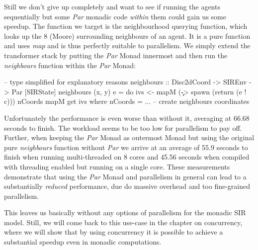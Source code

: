 Still we don't give up completely and want to see if running the agents sequentially but some \textit{Par} monadic code \textit{within} them could gain us some speedup. The function we target is the neighbourhood querying function, which looks up the 8 (Moore) surrounding neighbours of an agent. It is a pure function and uses \textit{map} and is thus perfectly suitable to parallelism. We simply extend the transformer stack by putting the \textit{Par} Monad innermost and then run the \textit{neighbours} function within the \textit{Par} Monad:

\begin{HaskellCode}
-- type simplified for explanatory reasons
neighbours :: Disc2dCoord -> SIREnv -> Par [SIRState]
neighbours (x, y) e = do
    ivs <- mapM (\c -> spawn (return (e ! c))) nCoords
    mapM get ivs
  where
    nCoords = ... -- create neighbours coordinates
\end{HaskellCode}

Unfortunately the performance is even worse than without it, averaging at 66.68 seconds to finish. The workload seems to be too low for parallelism to pay off. Further, when keeping the \textit{Par} Monad as outermost Monad but using the original pure \textit{neighbours} function without \textit{Par} we arrive at an average of 55.9 seconds to finish when running multi-threaded on 8 cores and 45.56 seconds when compiled with threading enabled but running on a single core. These measurements demonstrate that using the \textit{Par} Monad and parallelism in general can lead to a substantially \textit{reduced} performance, due do massive overhead and too fine-grained parallelism.

This leaves us basically without any options of parallelism for the monadic SIR model. Still, we will come back to this use-case in the chapter on concurrency, where we will show that by using concurrency it is possible to achieve a substantial speedup even in monadic computations.